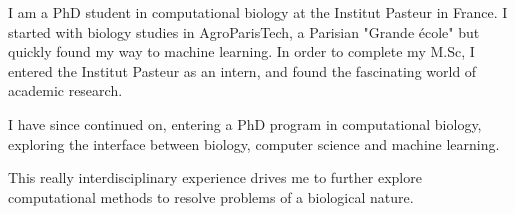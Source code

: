 \ifextended
  I am a PhD student in computational biology at the Institut Pasteur in France. I started with biology studies in AgroParisTech, a Parisian "Grande école" but quickly found my way to machine learning. In order to complete my M.Sc, I entered the Institut Pasteur as an intern, and found the fascinating world of academic research.

  I have since continued on, entering a PhD program in computational biology, exploring the interface between biology, computer science and machine learning.

  This really interdisciplinary experience drives me to further explore computational methods to resolve problems of a biological nature.
\fi